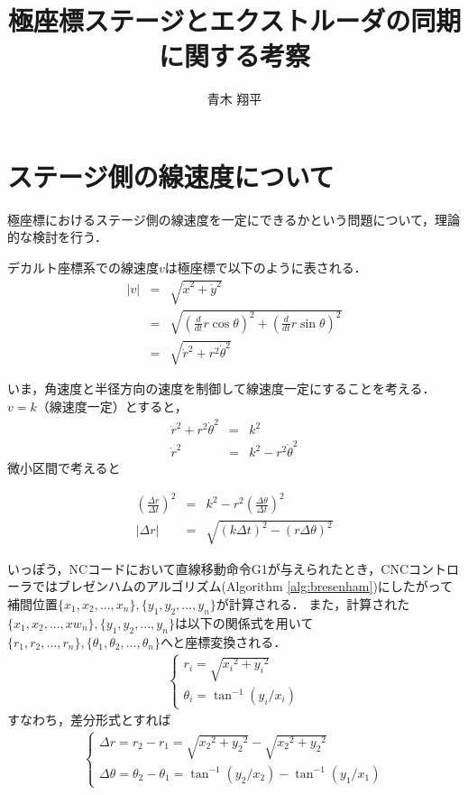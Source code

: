\documentclass[twocolumn,oneside,a4paper]{article}
\title{極座標ステージとエクストルーダの同期に関する考察}
\author{青木 翔平}
\begin{document}
\maketitle

\section{ステージ側の線速度について}
極座標におけるステージ側の線速度を一定にできるかという問題について，理論的な検討を行う．

デカルト座標系での線速度$v$は極座標で以下のように表される．
\begin{eqnarray}
|v| &=& \sqrt{\dot{x}^2 + \dot{y}^2} \nonumber \\
  &=& \sqrt{ \left(\frac{d}{dt} r \cos\theta \right) ^2 + \left(\frac{d}{dt}r \sin\theta\right) ^2} \nonumber \\
  &=& \sqrt{ \dot{r}^2+ r^2 \dot{\theta}^2 }
\end{eqnarray}    
    
いま，角速度と半径方向の速度を制御して線速度一定にすることを考える．
$v=k$（線速度一定）とすると，
\begin{eqnarray}\label{eq:vdef}
  \dot{r}^2+ r^2 \dot{\theta}^2 &=& k^2 \\
  \dot{r}^2 &=&  k^2 - r^2 \dot{\theta}^2
\end{eqnarray}
微小区間で考えると

\begin{eqnarray}\label{eq:deltar}
     \left( \frac{\Delta r}{\Delta t}\right)^2 &=&  k^2 - r^2 \left( \frac{\Delta \theta}{\Delta t}\right)^2 \nonumber \\
|\Delta r| &=& \sqrt{(k \Delta t)^2 - (r \Delta \theta)^2}
\end{eqnarray}

いっぽう，NCコードにおいて直線移動命令G1が与えられたとき，CNCコントローラではブレゼンハムのアルゴリズム(Algorithm \ref{alg:bresenham})にしたがって補間位置$\{x_1,x_2,...,x_n\},\{y_1,y_2,...,y_n\}$が計算される．
また，計算された$\{x_1,x_2,...,xw_n\},\{y_1,y_2,...,y_n\}$は以下の関係式を用いて$\{r_1,r_2,...,r_n\},\{\theta_1,\theta_2,...,\theta_n\}$へと座標変換される．　
\begin{eqnarray*}
\left\{
  \begin{array}{ll}
r_i = \sqrt{{x_i}^2+{y_i}^2} \\    
\theta_i = \tan^{-1} (y_i / x_i)
  \end{array}
  \right.
\end{eqnarray*}
すなわち，差分形式とすれば
\begin{eqnarray}\label{eq:diff}
\left\{
  \begin{array}{ll}
\Delta r = r_2-r_1 = \sqrt{{x_2}^2+{y_2}^2} - \sqrt{{x_2}^2+{y_2}^2} \\    
\Delta \theta = \theta_2-\theta_1 = \tan^{-1} (y_2 / x_2) - \tan^{-1} (y_1 / x_1)
  \end{array}
  \right.
\end{eqnarray}
\end{document}
